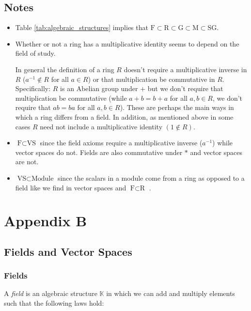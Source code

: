 \documentclass{article}
\theoremstyle{definition}
\begin{document}
\subsection*{Notes}
\begin{itemize}
\item Table \ref{tab:algebraic_structures} implies that $\text{F}
\subset \text{R} \subset \text{G} \subset \text{M} \subset \text{SG}$.
\item Whether or not a ring has a multiplicative identity 
      seems to depend on the field of study. 

\smallskip
\noindent
      In general the definition of a ring $R$ doesn't require a
      multiplicative inverse in $R$ ($a^{-1} \notin R$ for all $a
      \in R$) or that multiplication be commutative in
      $R$. Specifically: $R$ is an Abelian group under $+$ but we
      don't require that multiplication be commutative (while
      $a+b = b+a$ for all $a,b \in R$, we don't require that $ab
      = ba$ for all $a,b \in R$). These are perhaps the main ways
      in which a ring differs from a field. In addition, as
      mentioned above in some cases $R$ need not include a
      multiplicative identity $(1 \notin R)$.
\item $\text{F} \subset \text{VS}$ since the field axioms require
      a multiplicative inverse ($a^{-1}$) while vector spaces do
      not. Fields are also commutative under $*$ and vector
      spaces are not.
\item $\text{VS} \subset \text{Module}$ since the scalars in a
      module come from a ring as opposed to a field like we find
      in vector spaces and $\text{F} \subset \text{R}$
\cite{module_theory_blyth}.
\end{itemize}

\section*{Appendix B}
\subsection*{{\Large Fields and Vector Spaces}}

\smallskip
\subsubsection*{\large Fields}
A \emph{field} is an algebraic structure $\mathbb{K}$ in which we can 
add and multiply elements such that the following laws hold:
\end{document}
